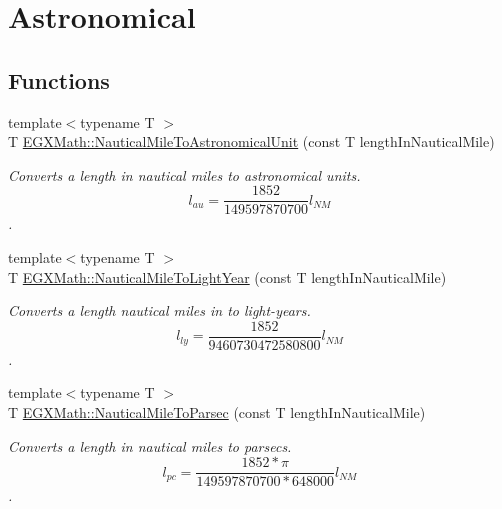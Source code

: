 \hypertarget{group___e_g_x_math-_conversions-_length_conversions-_non-_s_i-_nautical_mile-_astronomical}{}\section{Astronomical}
\label{group___e_g_x_math-_conversions-_length_conversions-_non-_s_i-_nautical_mile-_astronomical}
\subsection*{Functions}
\begin{DoxyCompactItemize}
\item 
{\footnotesize template$<$typename T $>$ }\\T \mbox{\hyperlink{group___e_g_x_math-_conversions-_length_conversions-_non-_s_i-_nautical_mile-_astronomical_ga637834e348d5ca8b121204dcff671e7d}{E\+G\+X\+Math\+::\+Nautical\+Mile\+To\+Astronomical\+Unit}} (const T length\+In\+Nautical\+Mile)
\begin{DoxyCompactList}\small\item\em Converts a length in nautical miles to astronomical units. \[ l_{au}= \frac{1852}{149597870700} l_{NM} \]. \end{DoxyCompactList}\item 
{\footnotesize template$<$typename T $>$ }\\T \mbox{\hyperlink{group___e_g_x_math-_conversions-_length_conversions-_non-_s_i-_nautical_mile-_astronomical_ga895ab2142f00d16718fa0297d076caa3}{E\+G\+X\+Math\+::\+Nautical\+Mile\+To\+Light\+Year}} (const T length\+In\+Nautical\+Mile)
\begin{DoxyCompactList}\small\item\em Converts a length nautical miles in to light-\/years. \[ l_{ly}= \frac{1852}{9460730472580800} l_{NM} \]. \end{DoxyCompactList}\item 
{\footnotesize template$<$typename T $>$ }\\T \mbox{\hyperlink{group___e_g_x_math-_conversions-_length_conversions-_non-_s_i-_nautical_mile-_astronomical_ga9ef59718174cef0ecf43e8eff8b961fe}{E\+G\+X\+Math\+::\+Nautical\+Mile\+To\+Parsec}} (const T length\+In\+Nautical\+Mile)
\begin{DoxyCompactList}\small\item\em Converts a length in nautical miles to parsecs. \[ l_{pc}=\frac{1852 * \pi}{149597870700 * 648000} l_{NM} \]. \end{DoxyCompactList}\end{DoxyCompactItemize}


